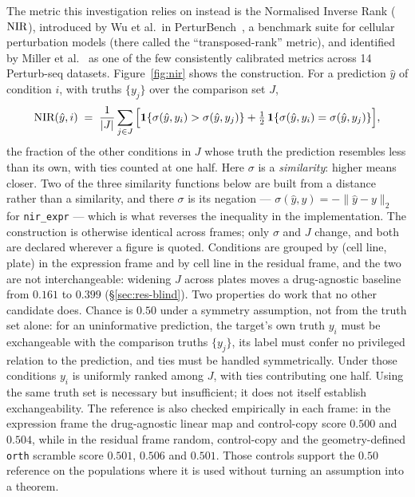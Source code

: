 The metric this investigation relies on instead is the Normalised Inverse Rank ($\textrm{NIR}$), introduced
by Wu et al.\ in PerturBench~\cite{perturbench}, a benchmark suite for cellular perturbation models
(there called the ``transposed-rank'' metric), and identified by Miller et al.~\cite{miller} as one
of the few consistently calibrated metrics across 14 Perturb-seq datasets. Figure~\ref{fig:nir} shows the construction. For a prediction $\hat{y}$ of
condition $i$, with truths $\{y_j\}$ over the comparison set $J$,
\begin{equation}
 \textrm{NIR}(\hat{y}, i) \;=\; \frac{1}{|J|}\sum_{j \in J}
 \Big[\mathbf{1}\{\sigma(\hat{y}, y_i) > \sigma(\hat{y}, y_j)\}
 + \tfrac{1}{2}\,\mathbf{1}\{\sigma(\hat{y}, y_i) = \sigma(\hat{y}, y_j)\}\Big],
\end{equation}
the fraction of the other conditions in $J$ whose truth the prediction resembles less than its own,
with ties counted at one half. Here $\sigma$ is a \emph{similarity}: higher means closer. Two of the
three similarity functions below are built from a distance rather than a similarity, and there
$\sigma$ is its negation --- $\sigma(\hat y, y) = -\lVert \hat y - y\rVert_2$ for \texttt{nir\_expr} --- which is
what reverses the inequality in the implementation. The construction is otherwise identical across
frames; only $\sigma$ and $J$ change, and both are declared wherever a figure is quoted. Conditions are grouped
by (cell line, plate) in the expression frame and by cell line in the residual frame, and the two
are not interchangeable: widening $J$ across plates moves a drug-agnostic baseline from $0.161$
to $0.399$ (\S\ref{sec:res-blind}). Two properties do work that no other candidate does. Chance is
$0.50$ under a symmetry assumption, not from the truth set alone: for an uninformative prediction,
the target's own truth $y_i$ must be exchangeable with the comparison truths $\{y_j\}$, its label
must confer no privileged relation to the prediction, and ties must be handled symmetrically. Under
those conditions $y_i$ is uniformly ranked among $J$, with ties contributing one half. Using the
same truth set is necessary but insufficient; it does not itself establish exchangeability. The
reference is also checked empirically in each frame: in the expression frame the drug-agnostic
linear map and control-copy score $0.500$ and $0.504$, while in the residual frame random,
control-copy and the geometry-defined \texttt{orth} scramble score $0.501$, $0.506$ and $0.501$.
Those controls support the
$0.50$ reference on the populations where it is used without turning an assumption into a theorem.
